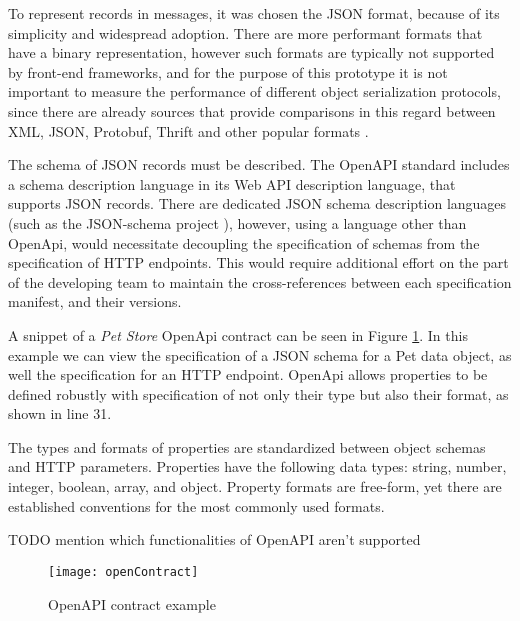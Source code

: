 To represent records in messages, it was chosen the JSON format, because of its simplicity and widespread adoption.
There are more performant formats that have a binary representation,
however such formats are typically not supported by front-end frameworks, and for the purpose of this prototype
it is not important to measure the performance of different object serialization protocols, since
there are already sources that provide comparisons in this regard between XML, JSON, Protobuf, Thrift and other popular formats \cite{serializationBenchmark}.

The schema of JSON records must be described.
The OpenAPI standard includes a schema description language in its Web API description language, that supports JSON records.
There are dedicated JSON schema description languages (such as the JSON-schema project \cite{jsonschema}), however,
using a language other than OpenApi, would necessitate decoupling the specification of schemas from the specification of HTTP endpoints.
This would require additional effort on the part of the developing team to maintain the cross-references
between each specification manifest, and their versions.

A snippet of a \textit{Pet Store} OpenApi contract can be seen in Figure \ref{fig:open_contract}.
In this example we can view the specification of a JSON schema for a Pet data object,
as well the specification for an HTTP endpoint.
OpenApi allows properties to be defined robustly with specification of not only their type but also their format, as shown in line 31.

The types and formats of properties are standardized between object schemas and HTTP parameters.
Properties have the following data types: string, number, integer, boolean, array, and object.
Property formats are free-form, yet there are established conventions for the most commonly used formats.

TODO mention which functionalities of OpenAPI aren't supported

\begin{figure}[htbp]
    \centering
    \centerline{\texttt{[image: openContract]}}
    \caption{OpenAPI contract example}
    \label{fig:open_contract}
\end{figure}

\newpage

